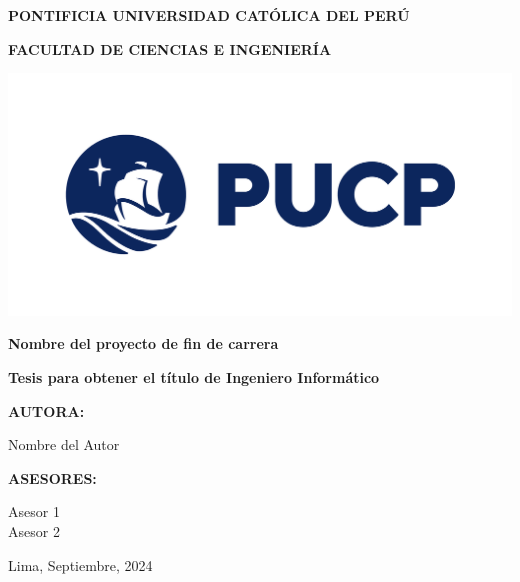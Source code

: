 \documentclass[12pt]{report}
\renewcommand{\contentsname}{\centerline{\Large\bfseries Tabla de Contenido}}
\begin{document}
\begin{titlepage}
  \centering
  {\bfseries\fontsize{14pt}{28pt}\selectfont PONTIFICIA UNIVERSIDAD CATÓLICA DEL PERÚ \par}
  {\bfseries\fontsize{14pt}{28pt}\selectfont FACULTAD DE CIENCIAS E INGENIERÍA \par}
  \vfill
  {\includegraphics[width=1\textwidth]{Images/logo_pucp.png}\par} %
  {\bfseries\fontsize{16pt}{28pt}\selectfont Nombre del proyecto de fin de carrera \par}
  {\bfseries\fontsize{14pt}{28pt}\selectfont Tesis para obtener el título de Ingeniero Informático \par}
  \vfill
  {\bfseries\fontsize{14pt}{28pt}\selectfont AUTORA: \par}
  {\fontsize{14pt}{28pt}\selectfont Nombre del Autor \par}
  \vfill
  {\bfseries\fontsize{14pt}{28pt}\selectfont ASESORES: \par}
  {\fontsize{14pt}{28pt}\selectfont Asesor 1 \\ Asesor 2 \par}
  \vfill
  {\fontsize{14pt}{28pt}\selectfont Lima, Septiembre, 2024 \par}
\end{titlepage}

\setlength{\parindent}{1cm}                     %
\fontsize{12}{24}\selectfont                    %

\renewcommand{\contentsname}{\centerline{\Large\bfseries Tabla de Contenido}}
\tableofcontents
\clearpage
\end{document}
